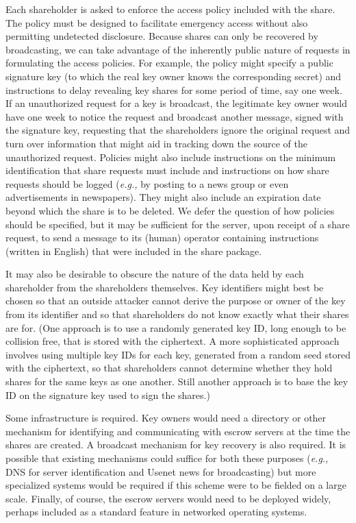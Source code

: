 Each shareholder is asked to enforce the access policy included with
the share.  The policy must be designed to facilitate emergency access
without also permitting undetected disclosure.  Because shares can
only be recovered by broadcasting, we can take advantage of the
inherently public nature of requests in formulating the access
policies.  For example, the policy might specify a public signature
key (to which the real key owner knows the corresponding secret) and
instructions to delay revealing key shares for some period of time,
say one week.  If an unauthorized request for a key is broadcast, the
legitimate key owner would have one week to notice the request and
broadcast another message, signed with the signature key, requesting
that the shareholders ignore the original request and turn over
information that might aid in tracking down the source of the
unauthorized request.  Policies might also include instructions on the
minimum identification that share requests must include and
instructions on how share requests should be logged ({\em e.g.,} by
posting to a news group or even advertisements in newspapers).  They
might also include an expiration date beyond which the share is to be
deleted.  We defer the question of how policies should be specified,
but it may be sufficient for the server, upon receipt of a share
request, to send a message to its (human) operator containing
instructions (written in English) that were included in the share
package.

It may also be desirable to obscure the nature of the data held by
each shareholder from the shareholders themselves.  Key identifiers
might best be chosen so that an outside attacker cannot derive the
purpose or owner of the key from its identifier and so that
shareholders do not know exactly what their shares are for.  (One
approach is to use a randomly generated key ID, long enough to be
collision free, that is stored with the ciphertext.  A more
sophisticated approach involves using multiple key IDs for each key,
generated from a random seed stored with the ciphertext, so that
shareholders cannot determine whether they hold shares for the same
keys as one another.  Still another approach is to base the key ID on
the signature key used to sign the shares.)

Some infrastructure is required.  Key owners would need a directory or
other mechanism for identifying and communicating with escrow servers
at the time the shares are created.  A broadcast mechanism for key
recovery is also required.  It is possible that existing mechanisms
could suffice for both these purposes ({\em e.g.,} DNS for server
identification and Usenet news for broadcasting) but more specialized
systems would be required if this scheme were to be fielded on a large
scale.  Finally, of course, the escrow servers would need to be
deployed widely, perhaps included as a standard feature in networked
operating systems.

